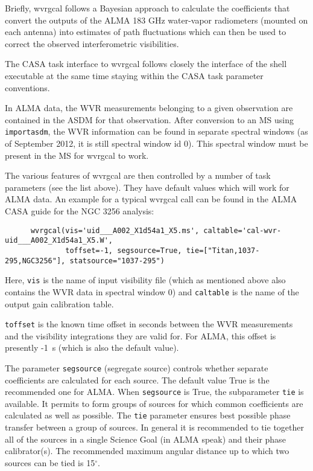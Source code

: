 Briefly, wvrgcal follows a Bayesian approach to calculate the
coefficients that convert the outputs of the ALMA 183 GHz water-vapor
radiometers (mounted on each antenna) into estimates of path
fluctuations which can then be used to correct the observed
interferometric visibilities.

The CASA task interface to wvrgcal follows closely the interface of
the shell executable at the same time staying within the CASA task
parameter conventions.

In ALMA data, the WVR measurements belonging to a given observation
are contained in the ASDM for that observation. After conversion to an
MS using {\tt importasdm}, the WVR information can be found in
separate spectral windows (as of September 2012, it is still spectral
window id 0).  This spectral window must be present in the MS for
wvrgcal to work.

The various features of wvrgcal are then controlled by a number of
task parameters (see the list above).  They have default values which
will work for ALMA data.  An example for a typical wvrgcal call can be
found in the ALMA CASA guide for the NGC 3256 analysis:

\small
\begin{verbatim}
      wvrgcal(vis='uid___A002_X1d54a1_X5.ms', caltable='cal-wvr-uid___A002_X1d54a1_X5.W',  
              toffset=-1, segsource=True, tie=["Titan,1037-295,NGC3256"], statsource="1037-295")
\end{verbatim}
\normalsize

Here, {\tt vis} is the name of input visibility file (which as
mentioned above also contains the WVR data in spectral window 0) and
{\tt caltable} is the name of the output gain calibration table.

{\tt toffset} is the known time offset in seconds between the WVR
measurements and the visibility integrations they are valid for. For
ALMA, this offset is presently -1~s (which is also the default value).

The parameter {\tt segsource} (segregate source) controls whether
separate coefficients are calculated for each source. The default
value True is the recommended one for ALMA.  When {\tt segsource} is
True, the subparameter {\tt tie} is available. It permits to form
groups of sources for which common coefficients are calculated as well
as possible. The {\tt tie} parameter ensures best possible phase
transfer between a group of sources. In general it is recommended to
tie together all of the sources in a single Science Goal (in ALMA
speak) and their phase calibrator(s).  The recommended maximum angular
distance up to which two sources can be tied is 15$^\circ$.

